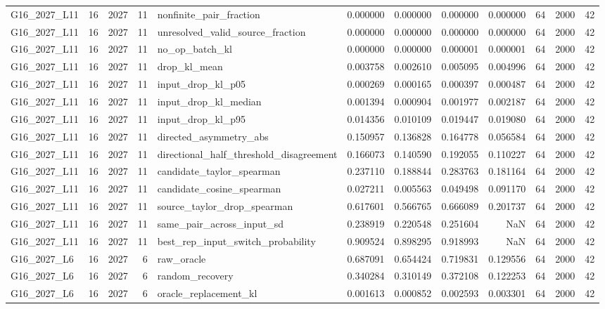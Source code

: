 \begin{tabular}{lrlrlrrrrrrr}
G16_2027_L11 & 16 & 2027 & 11 & nonfinite_pair_fraction & 0.000000 & 0.000000 & 0.000000 & 0.000000 & 64 & 2000 & 42 \\
G16_2027_L11 & 16 & 2027 & 11 & unresolved_valid_source_fraction & 0.000000 & 0.000000 & 0.000000 & 0.000000 & 64 & 2000 & 42 \\
G16_2027_L11 & 16 & 2027 & 11 & no_op_batch_kl & 0.000000 & 0.000000 & 0.000001 & 0.000001 & 64 & 2000 & 42 \\
G16_2027_L11 & 16 & 2027 & 11 & drop_kl_mean & 0.003758 & 0.002610 & 0.005095 & 0.004996 & 64 & 2000 & 42 \\
G16_2027_L11 & 16 & 2027 & 11 & input_drop_kl_p05 & 0.000269 & 0.000165 & 0.000397 & 0.000487 & 64 & 2000 & 42 \\
G16_2027_L11 & 16 & 2027 & 11 & input_drop_kl_median & 0.001394 & 0.000904 & 0.001977 & 0.002187 & 64 & 2000 & 42 \\
G16_2027_L11 & 16 & 2027 & 11 & input_drop_kl_p95 & 0.014356 & 0.010109 & 0.019447 & 0.019080 & 64 & 2000 & 42 \\
G16_2027_L11 & 16 & 2027 & 11 & directed_asymmetry_abs & 0.150957 & 0.136828 & 0.164778 & 0.056584 & 64 & 2000 & 42 \\
G16_2027_L11 & 16 & 2027 & 11 & directional_half_threshold_disagreement & 0.166073 & 0.140590 & 0.192055 & 0.110227 & 64 & 2000 & 42 \\
G16_2027_L11 & 16 & 2027 & 11 & candidate_taylor_spearman & 0.237110 & 0.188844 & 0.283763 & 0.181164 & 64 & 2000 & 42 \\
G16_2027_L11 & 16 & 2027 & 11 & candidate_cosine_spearman & 0.027211 & 0.005563 & 0.049498 & 0.091170 & 64 & 2000 & 42 \\
G16_2027_L11 & 16 & 2027 & 11 & source_taylor_drop_spearman & 0.617601 & 0.566765 & 0.666089 & 0.201737 & 64 & 2000 & 42 \\
G16_2027_L11 & 16 & 2027 & 11 & same_pair_across_input_sd & 0.238919 & 0.220548 & 0.251604 & NaN & 64 & 2000 & 42 \\
G16_2027_L11 & 16 & 2027 & 11 & best_rep_input_switch_probability & 0.909524 & 0.898295 & 0.918993 & NaN & 64 & 2000 & 42 \\
G16_2027_L6 & 16 & 2027 & 6 & raw_oracle & 0.687091 & 0.654424 & 0.719831 & 0.129556 & 64 & 2000 & 42 \\
G16_2027_L6 & 16 & 2027 & 6 & random_recovery & 0.340284 & 0.310149 & 0.372108 & 0.122253 & 64 & 2000 & 42 \\
G16_2027_L6 & 16 & 2027 & 6 & oracle_replacement_kl & 0.001613 & 0.000852 & 0.002593 & 0.003301 & 64 & 2000 & 42 \\

\end{tabular}
